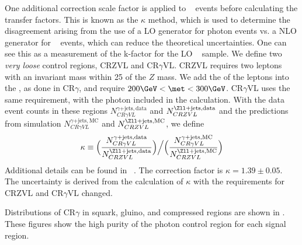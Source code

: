 One additional correction scale factor is applied to \gammajets~ events before calculating the transfer factors.
This is known as the $\kappa$ method, which is used to determine the disagreement arising from the use of a LO generator for photon events vs. a NLO generator for \zjets~ events, which can reduce the theoretical uncertainties.
One can see this as a measurement of the k-factor for the LO \gammajets~ sample.
We define two \textit{very loose} control regions, CRZVL and CR$\gamma$VL.
CRZVL requires two leptons with an invariant mass within 25 \GeV of the $Z$ mass.
We add the \pt of the leptons into the \met, as done in CR$\gamma$, and require $200 \GeV < \met < 300 \GeV$.
CR$\gamma$VL uses the same \met requirement, with the photon included in the \met calculation.
With the data event counts in these regions $N_{CR\gamma VL}^{\gamma\mathrm{+jets,data}}$ and $N_{CRZVL}^{\Zll\mathrm{+jets,data}}$ and the predictions from simulation $N_{CR\gamma VL}^{\gamma\mathrm{+jets,MC}}$ and $N_{CRZVL}^{\Zll\mathrm{+jets,MC}}$, we define
\begin{align}
\kappa \equiv \Big( \frac{N_{CR\gamma VL}^{\gamma\mathrm{+jets,data}}}{N_{CRZVL}^{\Zll\mathrm{+jets,data}}} \Big) \Big/ \Big( \frac{N_{CR\gamma VL}^{\gamma\mathrm{+jets,MC}}}{N_{CRZVL}^{\Zll\mathrm{+jets,MC}}} \Big)
\end{align}
Additional details can be found in ~\cite{0-leptonPaper,0LPaper_13TeV,ATLAS-CONF-2016-078}.
The correction factor is $\kappa = 1.39 \pm 0.05$.
The uncertainty is derived from the calculation of $\kappa$ with the \met requirements for CRZVL and CR$\gamma$VL changed.

Distributions of CR$\gamma$ in squark, gluino, and compressed regions are shown in .
These figures show the high purity of the photon control region for each signal region.

